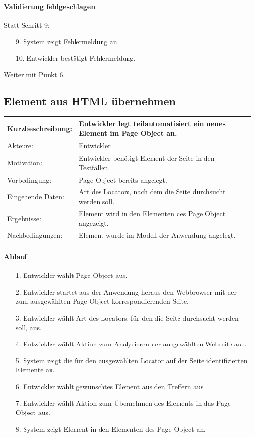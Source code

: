 \paragraph{Validierung fehlgeschlagen}
Statt Schritt 9:
\begin{itemize}
\item[9.] System zeigt Fehlermeldung an. 
\item[10.] Entwickler bestätigt Fehlermeldung. 
\end{itemize}
Weiter mit Punkt 6. 


\subsection{Element aus HTML übernehmen}
\label{sec:element_from_html}

\begin{tabular}[h]{|p{4cm}|p{}|}
\hline 
\rule[-1ex]{0pt}{2.5ex}Kurzbeschreibung: & 
Entwickler legt teilautomatisiert ein neues Element im Page Object an. \\  
\hline 
\rule[-1ex]{0pt}{2.5ex}Akteure: & 
Entwickler \\ 
\hline 
\rule[-1ex]{0pt}{2.5ex}Motivation: & 
Entwickler benötigt Element der Seite in den Testfällen. \\ 
\hline 
\rule[-1ex]{0pt}{2.5ex}Vorbedingung: & 
Page Object bereits angelegt. \\ 
\hline 
\rule[-1ex]{0pt}{2.5ex}Eingehende Daten: & Art des Locators, nach dem die Seite durchsucht werden soll. \\ 
\hline 
\rule[-1ex]{0pt}{2.5ex}Ergebnisse: & Element wird in den Elementen des Page Object angezeigt. \\ 
\hline 
\rule[-1ex]{0pt}{2.5ex}Nachbedingungen: & Element wurde im Modell der Anwendung angelegt.  \\ 
\hline 
\end{tabular} 

\paragraph{Ablauf}

\begin{itemize}[itemsep=0pt]
\item[1.] Entwickler wählt Page Object aus.
\item[2.] Entwickler startet aus der Anwendung heraus den Webbrowser mit der zum ausgewählten Page Object korrespondierenden Seite. 
\item[3.] Entwickler wählt Art des Locators, für den die Seite durchsucht werden soll, aus.
\item[4.] Entwickler wählt Aktion zum Analysieren der ausgewählten Webseite aus.
\item[5.] System zeigt die für den ausgewählten Locator auf der Seite identifizierten Elemente an.
\item[6.] Entwickler wählt gewünschtes Element aus den Treffern aus. 
\item[7.] Entwickler wählt Aktion zum Übernehmen des Elements in das Page Object aus.
\item[8.] System zeigt Element in den Elementen des Page Object an.
\end{itemize}

